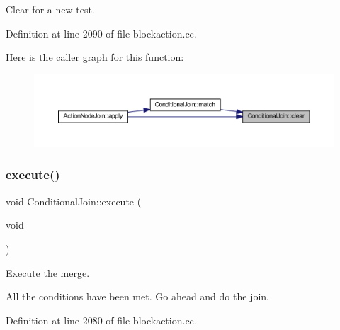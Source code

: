 Clear for a new test. 



Definition at line 2090 of file blockaction.\+cc.

Here is the caller graph for this function\+:
\nopagebreak
\begin{figure}[H]
\begin{center}
\leavevmode
\includegraphics[width=350pt]{class_conditional_join_a9e69ebb78367803c598edfdc5ef04f5a_icgraph}
\end{center}
\end{figure}
\mbox{\label{class_conditional_join_a7ddeb5ef416cda6bec2ca424b22e00a7}} 
\subsubsection{\texorpdfstring{execute()}{execute()}}
{\footnotesize\ttfamily void Conditional\+Join\+::execute (\begin{DoxyParamCaption}\item[{void}]{ }\end{DoxyParamCaption})}



Execute the merge. 

All the conditions have been met. Go ahead and do the join. 

Definition at line 2080 of file blockaction.\+cc.

